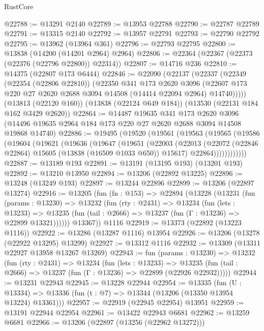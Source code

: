 \begin{lexlean}{RustCore}
\begin{coremodule}
@22788 := @13291 @2140
@22789 := @13953 @22788
@22790 := @22787 @22789
@22791 := @13315 @2140
@22792 := @13957 @22791
@22793 := @22790 @22792
@22795 := @13962 (@13964 @361)
@22796 := @22793 @22795
@22800 := @13838 (@14200 (@14201 @2964) @2964)
@22806 := @22364 (@22367 (@22373 (@22376 (@22796 @22800)) @22314))
@22807 := @14716 @236
@22810 := @14375 (@22807 @173 @6444)
@22846 := @22090
    (@22137
      (@22337
        (@22349
          (@22354 (@22806 @22810))
          (@22350
            @341
            @173
            @2620
            @3096
            (@22607 @173 @220 @27 @2620 @2688 @3094 @14508 (@14414 @22094 @2964) @14740)))))
    (@13813 (@22120 @160))
    (@13838 (@22124 @649 @184))
    (@13530 (@22131 @184 @162 @3429 @2620))
@22864 := @14487
    @19635
    @341
    @173
    @2620
    @3096
    (@14496 @19635 @2964 @184 @173 @220 @27 @2620 @2688 @3094 @14508 @19868 @14740)
@22886 := @19495
    (@19520
      (@19561
        (@19563
          (@19565
            (@19586
              (@19604
                (@19621
                  (@19636
                    (@19647
                      (@19651
                        (@22003
                          (@22013
                            (@22072 (@22846 @22864) @15605 (@13838 (@16509 @1033 @650)) @15617)
                            @22864))))))))))))
@22887 := @13189 @193
@22891 := @13191 (@13195 @193) (@13201 @193)
@22892 := @13210 @13950
@22894 := @13206 (@22892 @13225)
@22896 := @13248 (@13249 @193)
@22897 := @13244 @22896
@22899 := @13206 (@22897 @13274)
@22916 := @13205
    (fun (fn : @153) =>
    @22894
      (@13228
        (@13231
          (fun (params : @13230) =>
          @13232
            (fun (rty : @2431) =>
            @13234
              (fun (lets : @13233) =>
              @13235 (fun (tail : @2666) => @13237 (fun (Γ : @13236) => @22899 @13321))))))
        @13367))
    @1116
@22919 := @13373 (@22892 (@13223 @1116))
@22922 := @13286 (@13287 @1116) @13954
@22926 := @13206 (@13278 (@22922 @13295) @13299)
@22927 := @13312 @1116
@22932 := @13309 (@13311 @22927 @13958 @13267 @13269)
@22943 := fun (params : @13230) =>
  @13232
    (fun (rty : @2431) =>
    @13234
      (fun (lets : @13233) =>
      @13235 (fun (tail : @2666) => @13237 (fun (Γ : @13236) => @22899 (@22926 @22932)))))
@22944 := @13231 @22943
@22945 := @13228 @22944
@22954 := @13335
    (fun (U : @13334) => @13336 (fun (t : @7) => @13344 (@13206 (@13350 @13954 @13224) @13361)))
@22957 := @22919 (@22945 @22954) @13951
@22959 := @13191 @22944 @22954
@22961 := @13422 @22943 @6681
@22962 := @13259 @6681
@22966 := @13206 (@22897 (@13256 (@22962 @13272)))

\end{coremodule}
\end{lexlean}
